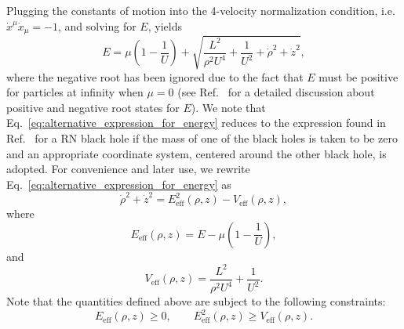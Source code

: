 Plugging the constants of motion into the 4-velocity normalization condition, i.e.~$\dot{x}^{\mu}\dot{x}_{\mu} = -1$, and solving for $E$, yields
%
\begin{equation}
    E = \mu\left(1-\frac{1}{U}\right) + \sqrt{\frac{L^2}{\rho^2U^4} + \frac{1}{U^2} + \dot{\rho}^2 + \dot{z}^2},
    \label{eq:alternative_expression_for_energy}
\end{equation}
%
where the negative root has been ignored due to the fact that $E$ must be positive for particles at infinity when $\mu = 0$ (see Ref.~\cite{RUFFINI1971} for a detailed discussion about positive and negative root states for $E$). We note that Eq.~\eqref{eq:alternative_expression_for_energy} reduces to the expression found in Ref.~\cite{DENARDO1973} for a RN black hole if the mass of one of the black holes is taken to be zero and an appropriate coordinate system, centered around the other black hole, is adopted. For convenience and later use, we rewrite Eq.~\eqref{eq:alternative_expression_for_energy} as
\begin{equation} \label{eq:effective1}
    \dot{\rho}^2 + \dot{z}^2 = E_{\mathrm {eff}}^2(\rho,z) - V_{\mathrm {eff}}(\rho,z),
\end{equation}
where
\begin{equation} \label{eq:effective2}
    E_{\mathrm {eff}}(\rho,z) = E - \mu\left(1-\frac{1}{U}\right),
\end{equation}
and
\begin{equation} \label{eq:effective3}
    V_{\mathrm {eff}}(\rho,z) =\frac{L^2}{\rho^2U^4} + \frac{1}{U^2}.
\end{equation}
Note that the quantities defined above are subject to the following constraints:
\begin{equation} \label{eq:effective_constraints}
    E_{\mathrm {eff}}(\rho,z) \ge 0, \qquad E_{\mathrm {eff}}^2(\rho,z) \ge V_{\mathrm {eff}}(\rho,z).
\end{equation}

